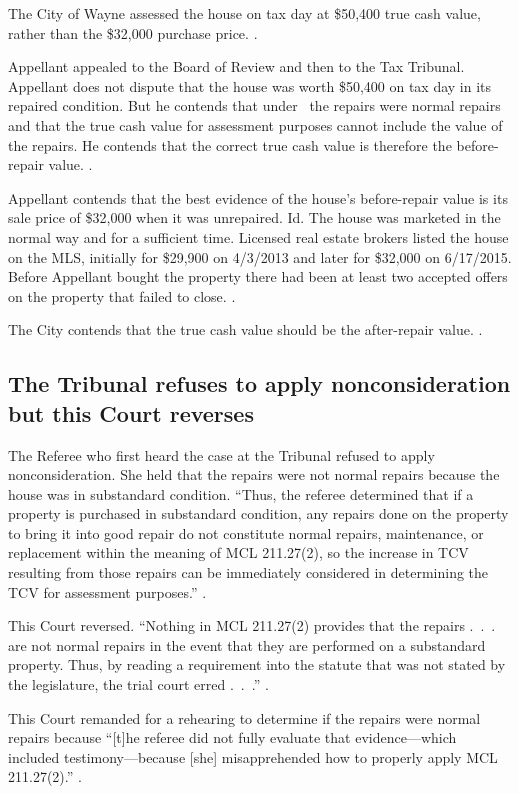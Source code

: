 \documentclass[12pt,\documentclassflag]{michiganCourtOfAppealsBrief}
\begin{document}
The City of Wayne assessed the house on tax day at \$50,400 true cash value, rather than the \$32,000 purchase price. \boardOfReviewDecision.

Appellant appealed to the Board of Review and then to the Tax Tribunal. Appellant does not dispute that the house was worth \$50,400 on tax day in its repaired condition. But he contends that under \mathieuGast\ the repairs were normal repairs and that the true cash value for assessment purposes cannot include the value of the repairs. He contends that the correct true cash value is therefore the before-repair value. \explanatoryLetter[2].

Appellant contends that the best evidence of the house's before-repair value is its sale price of \$32,000 when it was unrepaired. Id. The house was marketed in the normal way and for a sufficient time. Licensed real estate brokers listed the house on the MLS, initially for \$29,900 on 4/3/2013 and later for \$32,000 on 6/17/2015. Before Appellant bought the property there had been at least two accepted offers on the property that failed to close. \mlsHistory[]. 

The City contends that the true cash value should be the after-repair value. \cityEvidence.

\subsection{The Tribunal refuses to apply nonconsideration but this Court reverses}

The Referee who first heard the case at the Tribunal refused to apply nonconsideration. She held that the repairs were not normal repairs because the house was in substandard condition. ``Thus, the referee determined that if a property is purchased in substandard condition, any repairs done on the property to bring it into good repair do not constitute normal repairs, maintenance, or replacement within the meaning of MCL 211.27(2), so the increase in TCV resulting from those repairs can be immediately considered in determining the TCV for assessment purposes.'' .

This Court reversed. ``Nothing in MCL 211.27(2) provides that the repairs .~.~. are not normal repairs in the event that they are performed on a substandard property. Thus, by reading a requirement into the statute that was not stated by the legislature, the trial court erred .~.~.'' .

This Court remanded for a rehearing to determine if the repairs were normal repairs because ``[t]he referee did not fully evaluate that evidence---which included testimony---because [she] misapprehended how to properly apply MCL 211.27(2).'' .
\end{document}
